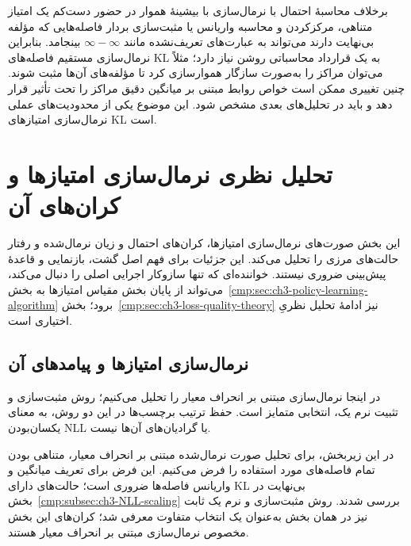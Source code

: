 برخلاف محاسبهٔ احتمال با نرمال‌سازی با بیشینهٔ هموار در حضور دست‌کم یک امتیاز متناهی، مرکزکردن و محاسبه واریانس یا مثبت‌سازی بردار فاصله‌هایی که مؤلفه بی‌نهایت دارند می‌تواند به عبارت‌های تعریف‌نشده مانند $\infty-\infty$ بینجامد. بنابراین نرمال‌سازی مستقیم فاصله‌های KL به یک قرارداد محاسباتی روشن نیاز دارد؛ مثلاً می‌توان مراکز را به‌صورت سازگار هموارسازی کرد تا مؤلفه‌های آن‌ها مثبت شوند. چنین تغییری ممکن است خواص روابط مبتنی بر میانگین دقیق مراکز را تحت تأثیر قرار دهد و باید در تحلیل‌های بعدی مشخص شود. این موضوع یکی از محدودیت‌های عملی نرمال‌سازی امتیازهای KL است.



\section{تحلیل نظری نرمال‌سازی امتیازها و کران‌های آن}
\label{cmp:sec:ch3-score-normalization-theory}
این بخش صورت‌های نرمال‌سازی امتیازها،
کران‌های احتمال و زیان نرمال‌شده و
رفتار حالت‌های مرزی را تحلیل می‌کند.
این جزئیات برای فهم اصل گشت،
بازنمایی و قاعدهٔ پیش‌بینی ضروری نیستند.
خواننده‌ای که تنها سازوکار اجرایی اصلی
را دنبال می‌کند، می‌تواند از پایان بخش
مقیاس امتیازها به
بخش~\ref{cmp:sec:ch3-policy-learning-algorithm}
برود؛ بخش~\ref{cmp:sec:ch3-loss-quality-theory}
نیز ادامهٔ تحلیل نظریِ اختیاری است.

\subsection{نرمال‌سازی امتیازها و پیامدهای آن}
\label{cmp:subsec:ch3-normalized-NLL}

در اینجا نرمال‌سازی مبتنی بر انحراف معیار
را تحلیل می‌کنیم؛ روش مثبت‌سازی و تثبیت نرم یک،
انتخابی متمایز است. حفظ ترتیب برچسب‌ها
در این دو روش، به معنای یکسان‌بودن NLL
یا گرادیان‌های آن‌ها نیست.

در این زیربخش، برای تحلیل صورت نرمال‌شده مبتنی بر انحراف معیار، متناهی بودن تمام فاصله‌های مورد استفاده را فرض می‌کنیم. این فرض برای تعریف میانگین و واریانس فاصله‌ها ضروری است؛ حالت‌های دارای KL بی‌نهایت در بخش~\ref{cmp:subsec:ch3-NLL-scaling} بررسی شدند. روش مثبت‌سازی و نرم یک ثابت نیز در همان بخش به‌عنوان یک انتخاب متفاوت معرفی شد؛ کران‌های این بخش مخصوص نرمال‌سازی مبتنی بر انحراف معیار هستند.

